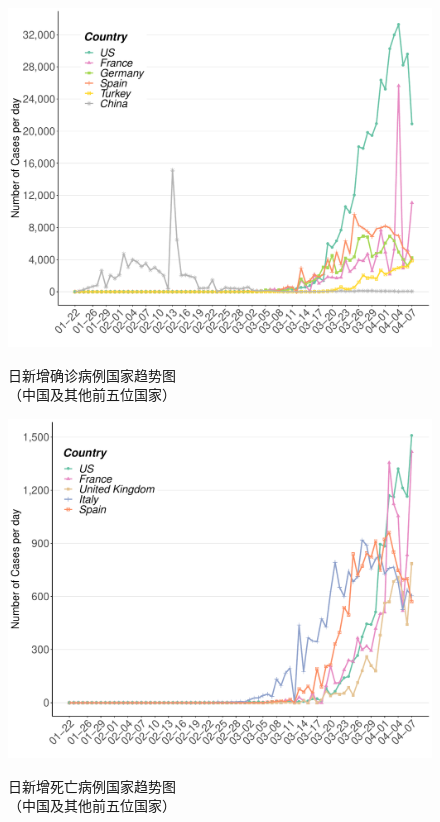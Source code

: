 \documentclass[]{article}
\begin{document}
\begin{figure}[H]
\caption{日新增确诊病例国家趋势图 \\（中国及其他前五位国家）} %
\centering
\includegraphics[]{./input/covid2.pdf} 
\label{} %
\end{figure}

\begin{figure}[H]
\caption{日新增死亡病例国家趋势图 \\（中国及其他前五位国家）} %
\centering
\includegraphics[]{./input/covid3.pdf} 
\label{} %
\end{figure}
\end{document}
